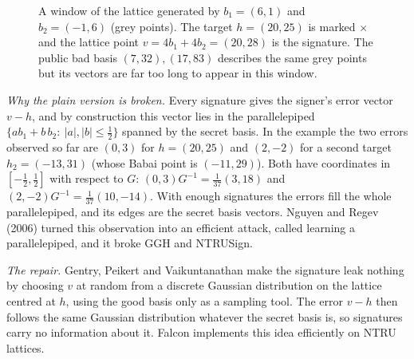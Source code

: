 \documentclass[11pt,a4paper]{article}
\theoremstyle{definition}
\begin{document}
\begin{figure}[h]
\centering
{}
\caption{A window of the lattice generated by $b_1=(6,1)$ and $b_2=(-1,6)$ (grey points). The target $h=(20,25)$ is marked $\times$ and the lattice point $v=4b_1+4b_2=(20,28)$ is the signature. The public bad basis $(7,32),(17,83)$ describes the same grey points but its vectors are far too long to appear in this window.}
\end{figure}

\emph{Why the plain version is broken.} Every signature gives the signer's error vector $v-h$, and by construction this vector lies in the parallelepiped $\{a b_1+b\,b_2:\ |a|,|b|\le\tfrac12\}$ spanned by the secret basis. In the example the two errors observed so far are $(0,3)$ for $h=(20,25)$ and $(2,-2)$ for a second target $h_2=(-13,31)$ (whose Babai point is $(-11,29)$). Both have coordinates in $[-\tfrac12,\tfrac12]$ with respect to $G$: $(0,3)G^{-1}=\tfrac1{37}(3,18)$ and $(2,-2)G^{-1}=\tfrac1{37}(10,-14)$. With enough signatures the errors fill the whole parallelepiped, and its edges are the secret basis vectors. Nguyen and Regev (2006) turned this observation into an efficient attack, called learning a parallelepiped, and it broke GGH and NTRUSign.

\emph{The repair.} Gentry, Peikert and Vaikuntanathan make the signature leak nothing by choosing $v$ at random from a discrete Gaussian distribution on the lattice centred at $h$, using the good basis only as a sampling tool. The error $v-h$ then follows the same Gaussian distribution whatever the secret basis is, so signatures carry no information about it. Falcon implements this idea efficiently on NTRU lattices.
\end{document}
